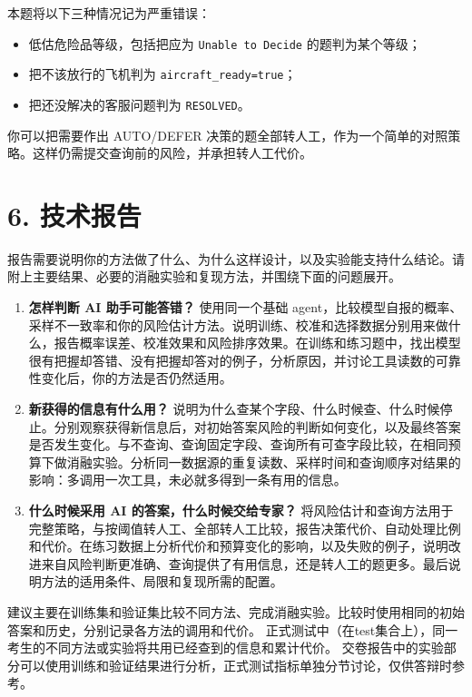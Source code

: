 \documentclass[11pt,a4paper]{article}
\providecommand{\tightlist}{\setlength{\itemsep}{3pt}\setlength{\parskip}{0pt}}
\begin{document}
本题将以下三种情况记为严重错误：

\begin{itemize}
\tightlist
\item
  低估危险品等级，包括把应为 \texttt{Unable\ to\ Decide}
  的题判为某个等级；
\item
  把不该放行的飞机判为 \texttt{aircraft\_ready=true}；
\item
  把还没解决的客服问题判为 \texttt{RESOLVED}。
\end{itemize}

你可以把需要作出 AUTO/DEFER
决策的题全部转人工，作为一个简单的对照策略。这样仍需提交查询前的风险，并承担转人工代价。


\section{6. 技术报告}\label{ux6280ux672fux62a5ux544a}

报告需要说明你的方法做了什么、为什么这样设计，以及实验能支持什么结论。请附上主要结果、必要的消融实验和复现方法，并围绕下面的问题展开。

\begin{enumerate}
\def\labelenumi{\arabic{enumi}.}
\item
  \textbf{怎样判断 AI 助手可能答错？} 使用同一个基础
  agent，比较模型自报的概率、采样不一致率和你的风险估计方法。说明训练、校准和选择数据分别用来做什么，报告概率误差、校准效果和风险排序效果。在训练和练习题中，找出模型很有把握却答错、没有把握却答对的例子，分析原因，并讨论工具读数的可靠性变化后，你的方法是否仍然适用。
\item
  \textbf{新获得的信息有什么用？}
  说明为什么查某个字段、什么时候查、什么时候停止。分别观察获得新信息后，对初始答案风险的判断如何变化，以及最终答案是否发生变化。与不查询、查询固定字段、查询所有可查字段比较，在相同预算下做消融实验。分析同一数据源的重复读数、采样时间和查询顺序对结果的影响：多调用一次工具，未必就多得到一条有用的信息。
\item
  \textbf{什么时候采用 AI 的答案，什么时候交给专家？}
  将风险估计和查询方法用于完整策略，与按阈值转人工、全部转人工比较，报告决策代价、自动处理比例和代价。在练习数据上分析代价和预算变化的影响，以及失败的例子，说明改进来自风险判断更准确、查询提供了有用信息，还是转人工的题更多。最后说明方法的适用条件、局限和复现所需的配置。
\end{enumerate}

建议主要在训练集和验证集比较不同方法、完成消融实验。比较时使用相同的初始答案和历史，分别记录各方法的调用和代价。
正式测试中（在test集合上），同一考生的不同方法或实验将共用已经查到的信息和累计代价。
交卷报告中的实验部分可以使用训练和验证结果进行分析，正式测试指标单独分节讨论，仅供答辩时参考。
\end{document}
